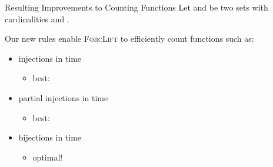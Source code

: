 \documentclass{beamer}
\begin{document}

\begin{frame}{Resulting Improvements to Counting Functions}
  Let \structure{$\Gamma$} and \structure{$\Delta$} be two sets with
  cardinalities  and .

  Our new rules enable \textsc{ForcLift} to efficiently count
  \structure{$\Gamma \to \Delta$} functions such as:
  \begin{itemize}
    \item injections in  time
          \begin{itemize}
            \item best: 
          \end{itemize}
    \item partial injections in  time
          \begin{itemize}
            \item best: 
          \end{itemize}
          \item bijections in  time
          \begin{itemize}
            \item \alert{optimal!}
          \end{itemize}
  \end{itemize}
\end{frame}
\end{document}
